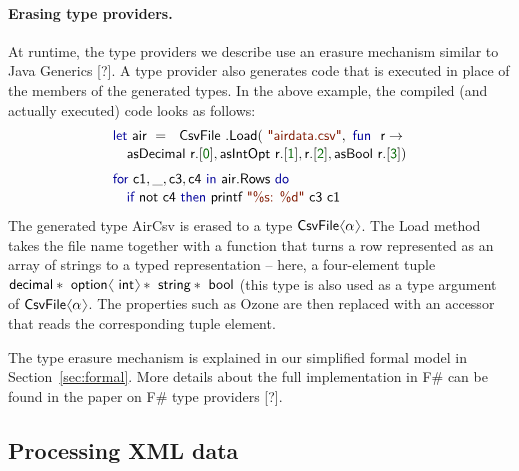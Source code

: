 \documentclass[preprint]{sigplanconf}
\newcommand{\langl}{\begin{picture}(4.5,7)
\put(1.1,2.5){\rotatebox{60}{\line(1,0){5.5}}}
\put(1.1,2.5){\rotatebox{300}{\line(1,0){5.5}}}
\end{picture}}
\newcommand{\rangl}{\begin{picture}(4.5,7)
\put(.9,2.5){\rotatebox{120}{\line(1,0){5.5}}}
\put(.9,2.5){\rotatebox{240}{\line(1,0){5.5}}}
\end{picture}}
\newcommand{\kvd}[1]{\textnormal{\textcolor{kvdclr}{\sffamily #1}}}
\newcommand{\num}[1]{\textnormal{\textcolor{numclr}{\sffamily #1}}}
\newcommand{\str}[1]{\textnormal{\textcolor{strclr}{\sffamily "#1"}}}
\newcommand{\ident}[1]{\textnormal{\sffamily #1}}
\begin{document}
\paragraph{Erasing type providers.}
At runtime, the type providers we describe use an erasure mechanism similar to Java Generics [?]. 
A type provider also generates code that is executed in place of the members of the generated types.
In the above example, the compiled (and actually executed) code looks as follows:
%
\begin{equation*}
\begin{array}{l}
 \kvd{let}~\ident{air}~=~\ident{CsvFile}\ident{.Load}(\str{airdata.csv}, \kvd{fun}~\ident{r}\rightarrow\\[0.1em]
 \quad \ident{asDecimal r}.[\num{0}], \ident{asIntOpt r}.[\num{1}], \ident{r}.[\num{2}], \ident{asBool r}.[\num{3}])\\[0.6em]
 \kvd{for}~\ident{c1},\_,\ident{c3},\ident{c4} ~\kvd{in}~\ident{air.Rows}~\kvd{do}\\[0.1em]
 \quad\kvd{if}~\ident{not}~\ident{c4}~\kvd{then}~\ident{printf}~\str{\%s: \%d}~\ident{c3 c1}\\
\end{array}
\end{equation*}
%
The generated type \ident{AirCsv} is erased to a type $\ident{CsvFile}\langl\alpha\rangl$.
The \ident{Load} method takes the file name together with a function that turns a row represented 
as an array of strings to a typed representation -- here, a four-element tuple 
$\ident{decimal}*\ident{option}\langl\ident{int}\rangl*\ident{string}*\ident{bool}$ (this type
is also used as a type argument of $\ident{CsvFile}\langl\alpha\rangl$. The properties
such as \ident{Ozone} are then replaced with an accessor that reads the corresponding tuple
element.

The type erasure mechanism is explained in our simplified formal model in Section~\ref{sec:formal}.
More details about the full implementation in F\# can be found in the paper on F\# type 
providers [?].


\subsection{Processing XML data}
\label{sec:providers-xml}
\end{document}

